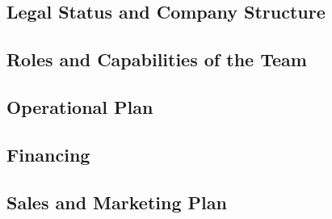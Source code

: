 \subsection*{Legal Status and Company Structure}\label{subsec:legalStatusAndCompanyStructure}


\subsection*{Roles and Capabilities of the Team}\label{subsec:rolesAndCapabilitiesOfTheTeam}


\subsection*{Operational Plan}

\subsection*{Financing}\label{subsec:financing}


\subsection*{Sales and Marketing Plan}